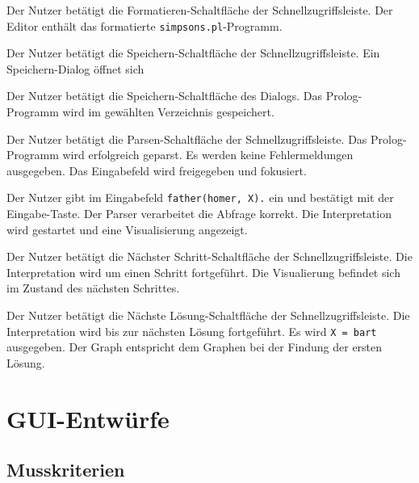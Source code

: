 \documentclass[parskip=full,11pt,twoside]{scrartcl}
\begin{document}
{Der Nutzer betätigt die Formatieren-Schaltfläche der Schnellzugriffsleiste.}
{Der Editor enthält das formatierte \texttt{simpsons.pl}-Programm.}

{Der Nutzer betätigt die Speichern-Schaltfläche der Schnellzugriffsleiste.}
{Ein Speichern-Dialog öffnet sich}

{Der Nutzer betätigt die Speichern-Schaltfläche des Dialogs.}
{Das Prolog-Programm wird im gewählten Verzeichnis gespeichert.}

{Der Nutzer betätigt die Parsen-Schaltfläche der Schnellzugriffsleiste.}
{Das Prolog-Programm wird erfolgreich geparst. Es werden keine Fehlermeldungen ausgegeben. Das Eingabefeld wird freigegeben und fokusiert.}

{Der Nutzer gibt im Eingabefeld \texttt{father(homer, X).} ein und bestätigt mit der Eingabe-Taste.}
{Der Parser verarbeitet die Abfrage korrekt. Die Interpretation wird gestartet und eine Visualisierung angezeigt.}

{Der Nutzer betätigt die Nächster Schritt-Schaltfläche der Schnellzugriffsleiste.}
{Die Interpretation wird um einen Schritt fortgeführt. Die Visualierung befindet sich im Zustand des nächsten Schrittes.}

{Der Nutzer betätigt die Nächste Lösung-Schaltfläche der Schnellzugriffsleiste.}
{Die Interpretation wird bis zur nächsten Lösung fortgeführt. Es wird \texttt{X = bart} ausgegeben. Der Graph entspricht dem Graphen bei der Findung der ersten Lösung.}

\appendix

\section{GUI-Entwürfe}

\subsection{Musskriterien}
\end{document}
